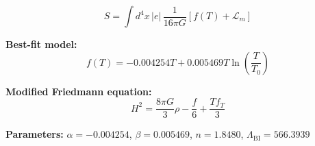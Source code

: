 
\begin{equation}
  S = \int d^4x \, |e| \, \frac{1}{16\pi G} \left[ f(T) + \mathcal{L}_m \right]
\end{equation}

\textbf{Best-fit model:}
\begin{equation}
  f(T) = -0.004254 T + 0.005469 T \ln\!\left(\frac{T}{T_0}\right)
\end{equation}

\textbf{Modified Friedmann equation:}
\begin{equation}
  H^2 = \frac{8\pi G}{3} \rho - \frac{f}{6} + \frac{T f_T}{3}
\end{equation}

\textbf{Parameters:}
$\alpha = -0.004254$, \quad
$\beta = 0.005469$, \quad
$n = 1.8480$, \quad
$\Lambda_{\text{BI}} = 566.3939$